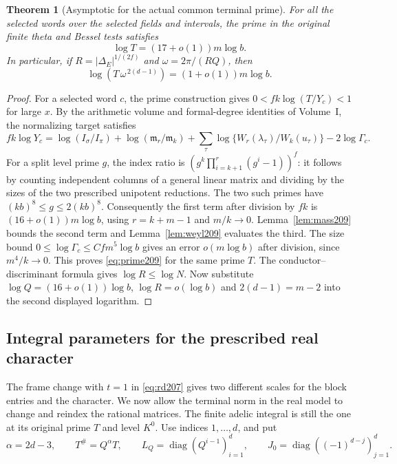 \documentclass[a4paper,11pt]{article}
\newtheorem{theorem}[proposition]{Theorem}
\theoremstyle{definition}
\theoremstyle{remark}
\numberwithin{equation}{section}
\begin{document}
\begin{theorem}[Asymptotic for the actual common terminal prime]
\label{thm:prime209}
For all the selected words over the selected fields and intervals,
the prime in the original finite theta and Bessel tests satisfies
\begin{equation}
            \log T=(17+o(1))m\log b.                    \label{eq:prime209}
\end{equation}
In particular, if \(R=|\Delta_E|^{1/(2f)}\) and
\(\omega=2\pi/(RQ)\), then
\[
             \log(T\,\omega^{\,2(d-1)})
                                      =(1+o(1))m\log b .
\]
\end{theorem}
\begin{proof}
For a selected word \(c\), the prime construction gives
\(0<fk\log(T/Y_c)<1\) for large \(x\). By the arithmetic
volume and formal-degree identities of Volume~I, the normalizing
target satisfies
\[
 fk\log Y_c
   =\log(I_\sigma/I_\pi)+\log(\mathfrak m_r/\mathfrak m_k)
     +\sum_\tau\log\{W_r(\lambda_\tau)/W_k(u_\tau)\}
     -2\log\Gamma_c .
\]
For a split level prime \(g\), the index ratio is
\((g^k\prod_{i=k+1}^r(g^i-1))^f\): it follows by counting
independent columns of a general linear matrix and dividing by
the sizes of the two prescribed unipotent reductions.
The two such primes have \((kb)^8\le g\le 2(kb)^8\).
Consequently the first term after division by \(fk\) is
\((16+o(1))m\log b\), using \(r=k+m-1\) and \(m/k\to0\).
Lemma~\ref{lem:mass209} bounds the second term and
Lemma~\ref{lem:weyl209} evaluates the third. The size bound
\(0\le\log\Gamma_c\le C f m^5\log b\) gives an error
\(o(m\log b)\) after division, since \(m^4/k\to0\).
This proves \eqref{eq:prime209} for the same prime \(T\).
The conductor--discriminant formula gives \(\log R\le\log N\).
Now substitute \(\log Q=(16+o(1))\log b\), \(\log R=o(\log b)\)
and \(2(d-1)=m-2\) into the second displayed logarithm.
\end{proof}

\subsection{Integral parameters for the prescribed real character}\label{nav:VII-15}
\label{sec:match209}

The frame change with \(t=1\) in \eqref{eq:rd207} gives
two different scales for the block entries and the character.
We now allow the terminal norm in the real model to change and
reindex the rational matrices. The finite adelic integral is
still the one at its original prime \(T\) and level \(K^0\).
Use indices \(1,\ldots,d\), and put
\[
 \alpha=2d-3,\qquad T^\#=Q^\alpha T,\qquad
 L_Q=\operatorname{diag}(Q^{i-1})_{i=1}^d,\qquad
 J_0=\operatorname{diag}((-1)^{d-j})_{j=1}^d .
\]
\end{document}
